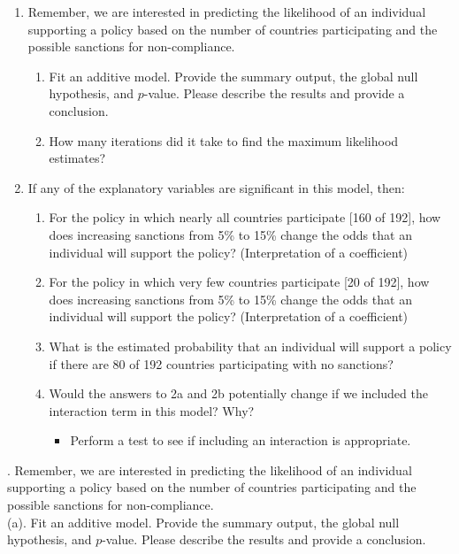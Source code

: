 \documentclass{article} %
\begin{document}
\begin{enumerate}
	\item
	Remember, we are interested in predicting the likelihood of an individual supporting a policy based on the number of countries participating and the possible sanctions for non-compliance.
\begin{enumerate}
		\item Fit an additive model. Provide the summary output, the global null hypothesis, and $p$-value. Please describe the results and provide a conclusion.
		\item How many iterations did it take to find the maximum likelihood estimates?
	\end{enumerate}
	
	\item
	If any of the explanatory variables are significant in this model, then:
	\begin{enumerate}
		\item
		For the policy in which nearly all countries participate [160 of 192], how does increasing sanctions from 5\% to 15\% change the odds that an individual will support the policy? (Interpretation of a coefficient)
		\item
		For the policy in which very few countries participate [20 of 192], how does increasing sanctions from 5\% to 15\% change the odds that an individual will support the policy? (Interpretation of a coefficient)
		\item
		What is the estimated probability that an individual will support a policy if there are 80 of 192 countries participating with no sanctions? 
		\item
		Would the answers to 2a and 2b potentially change if we included the interaction term in this model? Why? 
		\begin{itemize}
			\item Perform a test to see if including an interaction is appropriate.
		\end{itemize}
	\end{enumerate}
\end{enumerate}
\vspace{1.5cm}
. Remember, we are interested in predicting the likelihood of an individual supporting a policy based on the number of countries participating and the possible sanctions for non-compliance.\\

\noindent (a).  Fit an additive model. Provide the summary output, the global null hypothesis, and $p$-value. Please describe the results and provide a conclusion.\\
\end{document}
